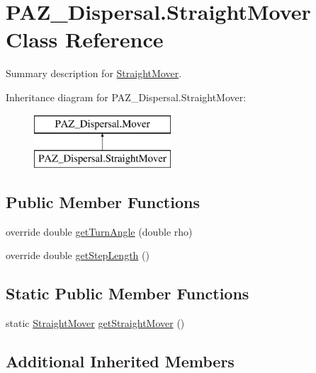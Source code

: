 \hypertarget{class_p_a_z___dispersal_1_1_straight_mover}{\section{P\-A\-Z\-\_\-\-Dispersal.\-Straight\-Mover Class Reference}
\label{class_p_a_z___dispersal_1_1_straight_mover}
}


Summary description for \hyperlink{class_p_a_z___dispersal_1_1_straight_mover}{Straight\-Mover}.  


Inheritance diagram for P\-A\-Z\-\_\-\-Dispersal.\-Straight\-Mover\-:\begin{figure}[H]
\begin{center}
\leavevmode
\includegraphics[height=2.000000cm]{class_p_a_z___dispersal_1_1_straight_mover}
\end{center}
\end{figure}
\subsection*{Public Member Functions}
\begin{DoxyCompactItemize}
\item 
override double \hyperlink{class_p_a_z___dispersal_1_1_straight_mover_a28530f8cd37142943d3b78e17ccc7674}{get\-Turn\-Angle} (double rho)
\item 
override double \hyperlink{class_p_a_z___dispersal_1_1_straight_mover_aa7497e388a599fc1c3f78292e54a337b}{get\-Step\-Length} ()
\end{DoxyCompactItemize}
\subsection*{Static Public Member Functions}
\begin{DoxyCompactItemize}
\item 
static \hyperlink{class_p_a_z___dispersal_1_1_straight_mover}{Straight\-Mover} \hyperlink{class_p_a_z___dispersal_1_1_straight_mover_a0e64e8f0b1b2714aeae0086c3c1cef6e}{get\-Straight\-Mover} ()
\end{DoxyCompactItemize}
\subsection*{Additional Inherited Members}



